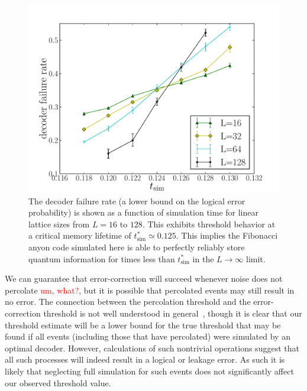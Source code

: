 \documentclass[aps, prl, letterpaper, twocolumn, superscriptaddress, notitlepage, 10pt]{revtex4-1}
\newcommand{\dude}[1]{\textcolor{red}{#1}}
\begin{document}
\begin{figure}[t!]
\begin{center}
	\includegraphics[width=\columnwidth]{anyons-kyle.pdf}
\caption{The decoder failure rate (a lower bound on the logical error probability) is shown as a function of simulation time for linear lattice sizes from $L=16$ to $128$. 
This exhibits threshold behavior at a critical memory lifetime of $t_{\mathrm{sim}}^*\simeq 0.125$. 
This implies the Fibonacci anyon code simulated here is able to perfectly reliably store quantum information for times less than $t_{\mathrm{sim}}^*$ in the $L\to \infty$ limit.}
\label{f:threshold}
\end{center}
\vspace{-10pt}
\end{figure}

We can guarantee that error-correction will succeed whenever noise does 
not percolate \dude{um, what?}, 
but it is possible that percolated events may still result in no error. 
The connection between the percolation threshold and the error-correction threshold 
is not well understood in general~\cite{Hastings2014}, though it is clear 
that our threshold estimate will be a lower bound for 
the true threshold that may be found if all events 
(including those that have percolated) were simulated by an optimal decoder. 
However, calculations of such nontrivial operations suggest that all such 
processes will indeed result in a logical or leakage error.
As such it is likely that neglecting full simulation for 
such events does not significantly affect our observed threshold value.
\end{document}
